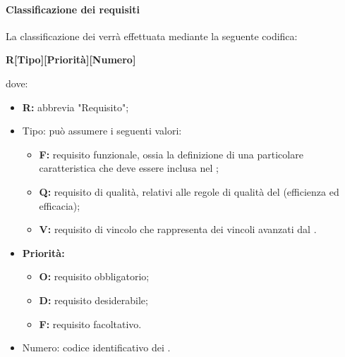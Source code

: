 \paragraph{Classificazione dei requisiti}
\label{Class_req}
La classificazione dei  verrà effettuata mediante la seguente codifica:\newline
\centerline{\textbf{R[Tipo][Priorità][Numero]}}\newline
dove:
\begin{itemize}
	\item \textbf{R:} abbrevia "Requisito";
	\item Tipo: può assumere i seguenti valori:
	\begin{itemize}
		\item \textbf{F:} requisito funzionale, ossia la definizione di una particolare caratteristica che deve essere inclusa nel ;
		\item \textbf{Q:} requisito di qualità, relativi alle regole di qualità del  (efficienza ed efficacia);
		\item \textbf{V:} requisito di vincolo che rappresenta dei vincoli avanzati dal .
	\end{itemize}
	\item \textbf{Priorità:}
	\begin{itemize}
		\item \textbf{O:} requisito obbligatorio;
		\item \textbf{D:} requisito desiderabile;
		\item \textbf{F:} requisito facoltativo.
	\end{itemize}
	\item Numero: codice identificativo dei .
\end{itemize}
